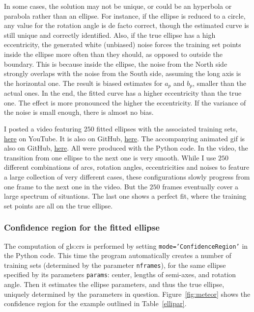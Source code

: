 \documentclass[oneside,10pt]{book}
\begin{document}
In some cases, the solution may not be unique, or could be an hyperbola or parabola rather than an ellipse. For instance, if the ellipse is reduced to a circle, any value for the rotation angle is de facto correct, though the estimated curve is still unique and correctly identified. Also, if the true ellipse has a high eccentricity, the generated white (unbiased) noise
 forces the training set points inside the ellipse more often than they should, as opposed to outside the boundary. This is because inside the ellipse, the noise from the North side strongly overlaps with the noise from the South side, assuming the long axis is the horizontal one. The result is biased estimates for $a_p$ and $b_p$, smaller than the actual ones. In the end, the fitted curve has a higher eccentricity than the true one. The effect is more pronounced the higher the eccentricity. If the variance of the noise is small enough, there is almost no bias.

I posted a video featuring $250$ fitted ellipses with the associated training sets, \href{https://youtu.be/ReyA9NWyjso}{here}  on YouTube.
It is also on GitHub, \href{https://github.com/VincentGranville/Machine-Learning/blob/main/Images/ellipseFitting300dpi.mp4}{here}. The accompanying animated gif is also on GitHub, \href{https://github.com/VincentGranville/Machine-Learning/blob/main/Images/ellipse100dpi.gif}{here}. All were produced with the Python code. In the video, the transition from one ellipse to the next one is very smooth. While I use $250$ different combinations of arcs, rotation angles, eccentricities and noises to feature a large collection of very different cases, these configurations slowly progress from one frame to the next one in the video. But the $250$ frames eventually cover a large spectrum of situations. The last one shows a perfect fit, where the training set points are all on the true ellipse.


\subsubsection{Confidence region for the fitted ellipse}

The computation of \glspl{gls:cr} is performed by setting \texttt{mode='ConfidenceRegion'} in the Python code. This time the program automatically creates a number of training sets (determined by the parameter \texttt{nframes}), for the same ellipse
specified by its parameters \texttt{params}: center, lengths of semi-axes, and rotation angle.
 Then it estimates the ellipse parameters, and thus the true ellipse, uniquely determined by the parameters in question. Figure~\ref{fig:meteor} shows the confidence region for the example outlined in Table~\ref{ellipar}.
\end{document}

